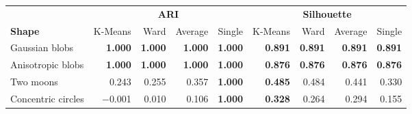 \begin{tabular}{lrrrrrrrr}
\toprule
& \multicolumn{4}{c}{\textbf{ARI}} & \multicolumn{4}{c}{\textbf{Silhouette}} \\
\cmidrule(lr){2-5}\cmidrule(lr){6-9}
\textbf{Shape} & K-Means & Ward & Average & Single & K-Means & Ward & Average & Single \\
\midrule
Gaussian blobs & \textbf{1.000} & \textbf{1.000} & \textbf{1.000} & \textbf{1.000} & \textbf{0.891} & \textbf{0.891} & \textbf{0.891} & \textbf{0.891} \\
Anisotropic blobs & \textbf{1.000} & \textbf{1.000} & \textbf{1.000} & \textbf{1.000} & \textbf{0.876} & \textbf{0.876} & \textbf{0.876} & \textbf{0.876} \\
Two moons & 0.243 & 0.255 & 0.357 & \textbf{1.000} & \textbf{0.485} & 0.484 & 0.441 & 0.330 \\
Concentric circles & $-$0.001 & 0.010 & 0.106 & \textbf{1.000} & \textbf{0.328} & 0.264 & 0.294 & 0.155 \\
\bottomrule
\end{tabular}
